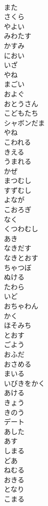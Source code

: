\documentclass[8pt]{extreport}
\begin{document}
\begin{CJK}{UTF8}{min}
\\	また
\\	さくら
\\	やよい
\\	みわたす
\\	かすみ
\\	におい
\\	いざ
\\	やね
\\	まごい
\\	およぐ
\\	おとうさん
\\	こどもたち
\\	シャボンだま
\\	やね
\\	こわれる
\\	きえる
\\	うまれる
\\	かぜ
\\	まつむし
\\	すずむし
\\	よなが
\\	こおろぎ
\\	なく
\\	くつわむし
\\	あき
\\	なきだす
\\	なきとおす
\\	ちゃつぼ
\\	ぬける
\\	たわら
\\	いど
\\	おちゃわん
\\	かく
\\	ほそみち
\\	とおす
\\	ごよう
\\	おふだ
\\	おさめる
\\	まいる
\\	いびきをかく
\\	あける
\\	きょう
\\	きのう
\\	デート
\\	あした 
\\	あす
\\	しまる
\\	どあ
\\	ねむる
\\	おきる
\\	となり
\\	こまる

\end{CJK}
\end{document}
